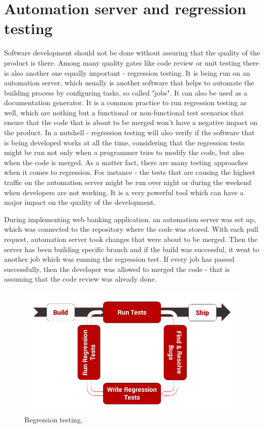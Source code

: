 \documentclass[a4paper,12pt]{book}
\newcommand\tab[1][1cm]{\hspace*{#1}}
\begin{document}
\section{Automation server and regression testing}
{
\tab Software development should not be done without assuring that the quality of the product is there. Among many quality gates like code review or unit testing there is also another one equally important - regression testing. It is being run on an automation server, which usually is another software that helps to automate the building process by configuring tasks, so called "jobs". It can also be used as a documentation generator. It is a common practice to run regression testing as well, which are nothing but a functional or non-functional test scenarios that ensure that the code that is about to be merged won't have a negative impact on the product. In a nutshell - regression testing will also verify if the software that is being developed works at all the time, considering that the regression tests might be run not only when a programmer tries to modify the code, but also when the code is merged. As a matter fact, there are many testing approaches when it comes to regression. For instance - the tests that are causing the highest traffic on the automation server might be run over night or during the weekend when developers are not working. It is a very powerful tool which can have a major impact on the quality of the development.

\bigskip During implementing web banking application, an automation server was set up, which was connected to the repository where the code was stored. With each pull request, automation server took changes that were about to be merged. Then the server has been building specific branch and if the build was successful, it went to another job which was running the regression test. If every job has passed successfully, then the developer was allowed to merged the code - that is assuming that the code review was already done.

\begin{figure}[H]
  \centering
    \includegraphics[width=1.0\textwidth]{regression}
    \caption{Regression testing.~\cite{reg}}
\end{figure}

}
\end{document}
